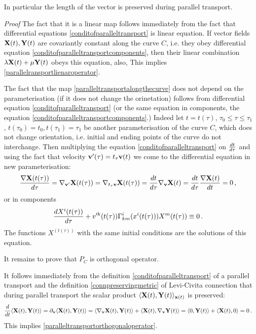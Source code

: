 \documentclass[12pt]{article}
\theoremstyle{theorem}
\numberwithin{equation}{section}
\begin{document}
{In particular the length of the vector is preserved
during parallel transport.


\smallskip

{\sl Proof}
The fact that it is a linear map follows immediately 
from the fact that
differential equations
\eqref{conditofparalleltransport}
 is linear equation.
If  vector fields ${\bf X}(t),{\bf Y}(t)$ are
 covariantly constant along the curve $C$, i.e. they obey  differential
equation \eqref{conditofparalleltransportcomponents}, 
then their linear
combination $\lambda {\bf X}(t)+\mu {\bf Y}(t)$ obeys this equation, also,
This implies \eqref{parallelransportlienaroperator}. 

The fact that the map \eqref{paralleltransportalongthecurve} 
does not depend on the parameterisation
(if it does not change the orinetation)
follows from  differential equation
\eqref{conditofparalleltransport} 
(or the same equation in components,
the equation \eqref{conditofparalleltransportcomponents}.)
Indeed let $t=t(\tau)$, $\tau_0\leq \tau\leq \tau_1$, 
$t(\tau_0)=t_0, 
t(\tau_1)=\tau_1$ be another parameterisation
of the curve $C$, which does not change orientation,
i.e. initial and ending  points
of the curve do not interchange.
 Then multiplying the equation 
\eqref{conditofparalleltransport} 
on ${dt\over d\tau}$
and using the fact that velocity ${\bf v}'(\tau)=t_\tau{\bf v}(t)$
we come to the differential equation
in new parameterisation: 
  $$
{\nabla {\bf X}(t(\tau))\over d\tau}=
  \nabla_{{\bf v}'}{\bf X}(t(\tau))=
  \nabla_{t_\tau{\bf v}}{\bf X}(t(\tau))=
  {dt\over d\tau}\nabla_{\bf v}{\bf X}(t)=
  {dt\over d\tau}{\nabla {\bf X}(t)\over dt}=0\,,
    $$
or in components
         \begin{equation}
\label{conditofparalleltransportcomponentsnewparameter}
    {dX^i(t(\tau))\over d\tau}+v'^k(t(\tau))\Gamma^i_{km}(x^i(t(\tau)))X^m(t(\tau))\equiv 0\,.
  \end{equation}
The functions $X^(t(\tau))$ with the 
same initial conditions are the solutions of this equation.



It remains to prove that $P_C$ is orthogonal operator.

It follows immediately from the definition 
\eqref{conditofparalleltransport} of a parallel transport
and the definition  \eqref{connpreservingmetric} 
of Levi-Civita connection that during parallel transport
  the scalar product $\langle{\bf X}(t),{\bf Y}(t)\rangle_{{\bf x}(t)}$
is preserved:
\begin{equation}\label{lengthdoesnotchangeduringparalleltransport}
{d\over dt}\langle{\bf X}(t),{\bf Y}(t)\rangle=
 \partial_{\bf v}\langle{\bf X}(t),{\bf Y}(t)\rangle=
\left\langle\nabla_{\bf v} {\bf X}(t), {\bf Y}(t)\right\rangle+
\left\langle{\bf X}(t), \nabla_{\bf v} {\bf Y}(t)\right\rangle=
 \langle 0, {\bf Y}(t)\rangle+
 \langle {\bf X}(t), 0\rangle
    =0\,.
     \end{equation}
This implies \eqref{paralleltransportorthogonaloperator}. 


}
\end{document}
